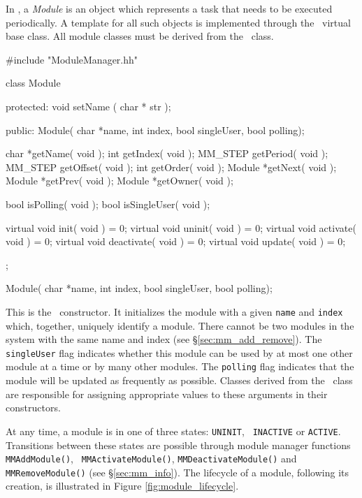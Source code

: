 In \rhexlib, a {\it Module} is an object which represents a task that needs
to be executed periodically. A template for all such objects is implemented
through the \Module\ virtual base class. All module classes must be derived
from the \Module\ class.

\begin{codesegment}
#include "ModuleManager.hh"
\end{codesegment}

\begin{classdef}
class Module {
protected:
  void setName ( char * str );

public:
  Module( char *name, int index, bool singleUser, bool polling);
  
  char   *getName( void );
  int     getIndex( void );
  MM_STEP getPeriod( void );
  MM_STEP getOffset( void );
  int     getOrder( void );
  Module *getNext( void );
  Module *getPrev( void );
  Module *getOwner( void );
  
  bool    isPolling( void );
  bool    isSingleUser( void );
  
  virtual void init( void ) = 0;
  virtual void uninit( void ) = 0;
  virtual void activate( void ) = 0;
  virtual void deactivate( void ) = 0;
  virtual void update( void ) = 0;
};  
\end{classdef}

\begin{prototype}
Module( char *name, int index, bool singleUser, bool polling);
\end{prototype}

This is the \Module\ constructor. It initializes the module with a given
{\tt name} and {\tt index} which, together, uniquely identify a
module. There cannot be two modules in the system with the same name and
index (see \S\ref{sec:mm_add_remove}). The {\tt singleUser} flag indicates
whether this module can be used by at most one other module at a time or by
many other modules. The {\tt polling} flag indicates that the module will be
updated as frequently as possible. Classes derived from the \Module\ class
are responsible for assigning appropriate values to these arguments in their
constructors.

At any time, a module is in one of three states: {\tt UNINIT}, {\tt
INACTIVE} or {\tt ACTIVE}. Transitions between these states are possible
through module manager functions {\tt MMAddModule()}, {\tt
MMActivateModule()}, {\tt MMDeactivateModule()} and {\tt MMRemoveModule()}
(see \S\ref{sec:mm_info}). The lifecycle of a module, following its
creation, is illustrated in Figure \ref{fig:module_lifecycle}.


